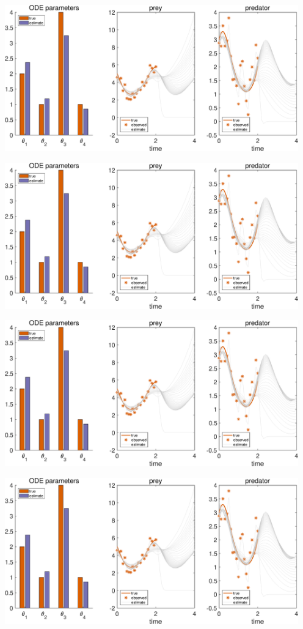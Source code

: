 {\includegraphics [width=5in]{Lotka_Volterra_3_41.eps}

\includegraphics [width=5in]{Lotka_Volterra_3_42.eps}

\includegraphics [width=5in]{Lotka_Volterra_3_43.eps}

\includegraphics [width=5in]{Lotka_Volterra_3_44.eps}

}

